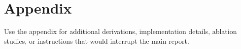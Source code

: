 \section{Appendix}

Use the appendix for additional derivations, implementation details,
ablation studies, or instructions that would interrupt the main report.
